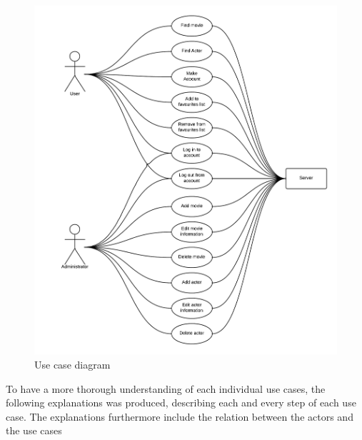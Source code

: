 \begin{figure}[H]
\includegraphics[width=\linewidth]{img/usecasediagram.png}
\caption{Use case diagram}
\label{fig:use case diagram}
\end{figure}

To have a more thorough understanding of each individual use cases, the following explanations was produced, describing each and every step of each use case.
The explanations furthermore include the relation between the actors and the use cases


